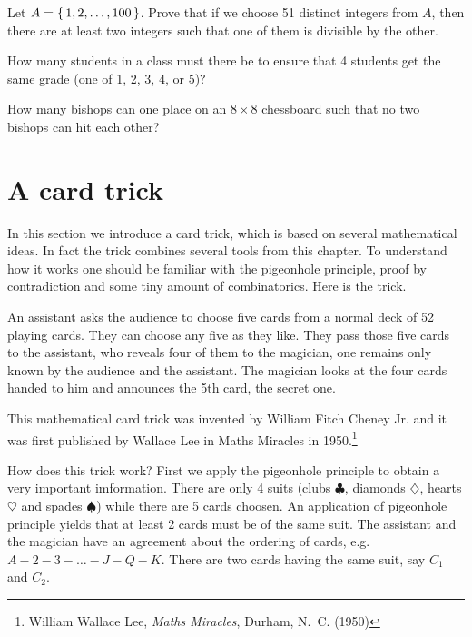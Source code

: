 \begin{exercise}\label{pigeon-4}
Let $A=\left\{\,1,2,\ldots,100\,\right\}$. Prove that if we choose 51 distinct integers from $A$, then there are at least two integers
such that one of them is divisible by the other.
\end{exercise}

\begin{exercise}\label{pigeon-5}
How many students in a class must there be to ensure that 4 students get the same grade (one of 1, 2, 3, 4, or 5)?
\end{exercise}

\begin{exercise}\label{pigeon-6}
How many bishops can one place on an $8\times 8$ chessboard such that no two bishops can hit each other?
\end{exercise}

\section{A card trick}
In this section we introduce a card trick, which is based on several mathematical ideas. In fact the trick combines several tools from
this chapter. To understand how it works one should be familiar with the pigeonhole principle, proof by contradiction and some tiny 
amount of combinatorics. Here is the trick. 

An assistant asks the audience to choose five cards from a normal deck of 52 playing cards. They can choose any five as they like.
They pass those five cards to the assistant, who reveals four of them to the magician, one remains only known by the audience and the 
assistant. The magician looks at the four cards handed to him and announces the 5th card, the secret one.

This mathematical card trick was invented by William Fitch Cheney Jr. and it was first published by Wallace Lee in Maths Miracles in 1950.\footnote{William Wallace Lee, \emph{Maths Miracles}, Durham, N.~C. (1950)}

How does this trick work? First we apply the pigeonhole principle to obtain a very important imformation. There are only 4 suits (clubs $\clubsuit$, diamonds $\diamondsuit$, 
hearts $\heartsuit$ and spades $\spadesuit$) while there are 5 cards choosen. An application of pigeonhole principle yields that at least 2 cards must be of the same suit.
The assistant and the magician have an agreement about the ordering of cards, e.g.\ $A-2-3-\ldots-J-Q-K$. There are two cards having the same suit, say $C_1$ and $C_2$. 

